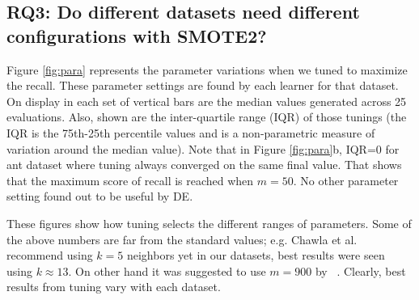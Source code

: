 \subsection{\textbf{RQ3: Do different datasets
      need different configurations with SMOTE2?}}

Figure \ref{fig:para} represents the parameter variations when we tuned to maximize the recall. These parameter settings are found by each learner for that dataset.
On display in each set of vertical bars are
the median values generated across 25 evaluations.
Also, shown are
the inter-quartile range (IQR) of those tunings (the IQR is the 75th-25th percentile values and is a non-parametric measure of variation
around the median value). Note that in Figure \ref{fig:para}b, IQR=0 for  ant dataset where tuning always converged on the same final value. That shows that the maximum score of recall is reached when $m=50$. No other parameter setting found out to be useful by DE.

  These figures
show how tuning selects the different ranges  of
parameters.
Some of the above numbers are far from the standard values; e.g. Chawla et al.~\cite{chawla2002smote} recommend using $k=5$ neighbors yet in our datasets, best results were seen using $k \approx 13$. On other hand it was suggested to use $m=900$ by ~\cite{pears2014synthetic}.
Clearly,
best results from tuning
vary with each dataset.


